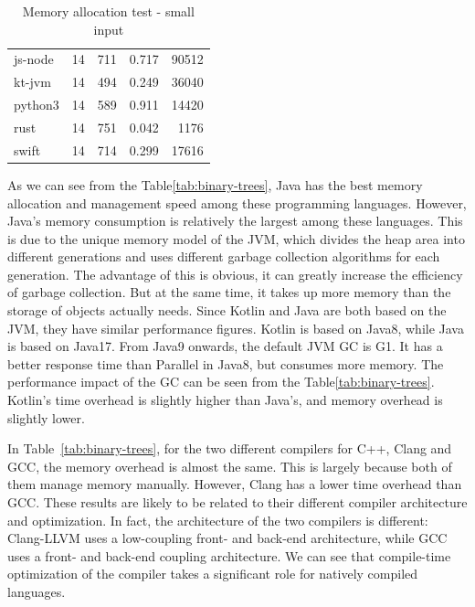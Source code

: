 \begin{table}[htbp]
\begin{subtable}[h]{0.495\linewidth}
\begin{tabular}{lrrrr}
            js-node   & 14 & 711     & 0.717  & 90512   \\
            kt-jvm    & 14 & 494     & 0.249  & 36040   \\
            python3   & 14 & 589     & 0.911  & 14420   \\
            rust      & 14 & 751     & 0.042  & 1176    \\
            swift     & 14 & 714     & 0.299  & 17616   \\
            \bottomrule
        \end{tabular}
        \caption{Memory allocation test - small input}
        \label{tab:binary-trees-2}
    \end{subtable}
\end{table}

As we can see from the Table\ref{tab:binary-trees},
Java has the best memory allocation and management
speed among these programming languages.
However, Java's memory consumption is relatively the largest among these languages.
This is due to the unique memory model of the JVM, which divides the heap area into
different generations and uses different garbage collection algorithms for each generation.
The advantage of this is obvious, it can greatly increase the efficiency of garbage
collection.
But at the same time, it takes up more memory than the storage of objects actually needs.
Since Kotlin and Java are both based on the JVM, they have similar performance figures.
Kotlin is based on Java8, while Java is based on Java17.
From Java9 onwards, the default JVM GC is G1.
It has a better response time than Parallel in Java8, but consumes more memory.
The performance impact of the GC can be seen from the Table\ref{tab:binary-trees}.
Kotlin's time overhead is slightly higher than Java's, and memory overhead is slightly lower.

In Table~\ref{tab:binary-trees},
for the two different compilers for C++, Clang and GCC, the memory overhead is almost the same.
This is largely because both of them manage memory manually.
However, Clang has a lower time overhead than GCC. These results are likely to be related to their
different compiler architecture and optimization.
In fact, the architecture of the two compilers is different:
Clang-LLVM uses a low-coupling front- and back-end architecture, while GCC uses a front- and back-end coupling
architecture.
We can see that compile-time optimization of the compiler takes a significant role for natively compiled languages.

